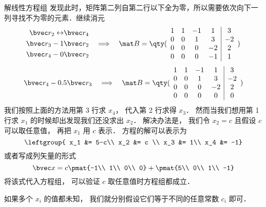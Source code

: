 \begin{example}{解线性方程组}
发现此时，矩阵第二列自第二行以下全为零，所以需要依次向下一列寻找不为零的元素．继续消元
\begin{equation}
\begin{aligned}
\bvec r_2 \leftrightarrow &\bvec r_4 \\
\bvec r_3 - 1 &\bvec r_2 \\
\bvec r_4 - 0 &\bvec r_2 \\
\end{aligned}
\quad \Longrightarrow \quad
\mat B={
	\qty(\begin{array}{cccc|c}
	1 &1 &-1  &1   &3  \\
	0 &0 &1   &3   &-2 \\
	0 &0 &0   &-2  &2  \\
	0 &0 &0   &-1  &1 \\
	\end{array} 
	)}
\end{equation}
\begin{equation}
\bvec r_4 - 0.5 \bvec r_3
\quad \Longrightarrow \quad
\mat B={
	\qty(\begin{array}{cccc|c}
	1 &1 &-1  &1   &3  \\
	0 &0 &1   &3   &-2 \\
	0 &0 &0   &-2  &2  \\
	0 &0 &0   &0   &0  \\
	\end{array} 
	)}
\end{equation}
我们按照上面的方法用第 3 行求 $x_4$， 代入第 2 行求得 $x_3$． 然而当我们想用第 1 行求 $x_1$ 的时候却出发现我们还没求出 $x_2$． 解决办法是， 我们令 $x_2 = c$ 且假设 $c$ 可以取任意值， 再把 $x_1$ 用 $c$ 表示． 方程的解可以表示为
\begin{equation}
\leftgroup{
x_1 &= 5-c\\
x_2 &= c \\
x_3 &= 1\\
x_4 &= -1}
\end{equation}
或者写成列矢量的形式
\begin{equation}
\bvec x = c \pmat{-1\\ 1\\ 0\\ 0} + \pmat{5\\ 0\\ 1\\ -1}
\end{equation}
将该式代入方程组， 可以验证 $c$ 取任意值时方程组都成立．

如果多个 $x_i$ 的值都未知， 我们就分别假设它们等于不同的任意常数 $c_i$ 即可．
\end{example}

